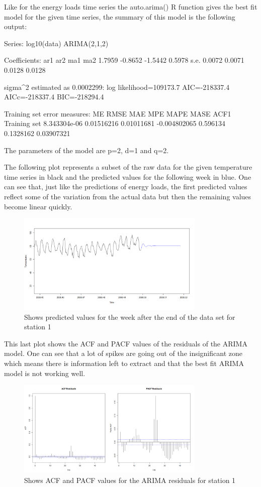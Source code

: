\documentclass{article} %
\begin{document}
Like for the energy loads time series the auto.arima() R function gives the best fit model for the given time series, the summary of this model is the following output:

Series: log10(data) 
ARIMA(2,1,2)                    

Coefficients:
         ar1      ar2      ma1     ma2
      1.7959  -0.8652  -1.5442  0.5978
s.e.  0.0072   0.0071   0.0128  0.0128

sigma^2 estimated as 0.0002299:  log likelihood=109173.7
AIC=-218337.4   AICc=-218337.4   BIC=-218294.4

Training set error measures:
                       ME       RMSE        MAE          MPE     MAPE      MASE       ACF1
Training set 8.343304e-06 0.01516216 0.01011681 -0.004802065 0.596134 0.1328162 0.03907321

The parameters of the model are p=2, d=1 and q=2.

The following plot represents a subset of the raw data for the given temperature time series in black and the predicted values for the following week in blue. One can see that, just like the predictions of energy loads, the first predicted values reflect some of the variation from the actual data but then the remaining values become linear quickly.

\begin{figure}
  \centering
    \includegraphics[width=0.80\textwidth]{TempPredictions}
  \caption{Shows predicted values for the week after the end of the data set for station 1 }
\end{figure}

This last plot shows the ACF and PACF values of the residuals of the ARIMA model. One can see that a lot of spikes are going out of the insignificant zone which means there is information left to extract and that the best fit ARIMA model is not working well.

\begin{figure}
  \centering
    \includegraphics[width=0.80\textwidth]{ACFandPACFTempArimaResults}
  \caption{Shows ACF and PACF values for the ARIMA residuals for station 1 }
\end{figure}
\end{document}

